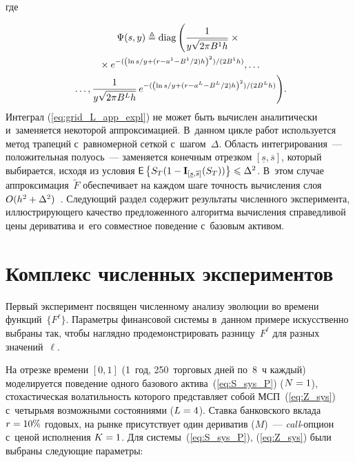 \begin{multicols}{2}
\noindent
где

\columnbreak


\noindent
\begin{multline*}
\Psi(s,y) \triangleq
\mathrm{diag} 
\left(\displaystyle\frac{\displaystyle 1\mathstrut}{\displaystyle y\sqrt{2\pi B^1 h}\mathstrut}\times{}\right.\\
{}\times e^{- ({\left( \ln {s}/{y}  +
(r- a^1 - {B^1}/{2} )h\right)^2})/({2B^1h})},\ldots \\
\left.\ldots,
\displaystyle\frac{\displaystyle 1\mathstrut}{\displaystyle y\sqrt{2\pi B^L h}\mathstrut}\, e^{- ({\left( \ln {s}/{y}  +
(r- a^L - {B^L}/{2} )h\right)^2})/(2B^Lh) }
\right)\!.\hspace*{-1.81146pt}
\end{multline*}
Интеграл (\ref{eq:grid_L_app_expl}) не может быть вы\-чис\-лен аналитически и~заменяется некоторой аппроксимацией.
В~данном цик\-ле работ используется метод трапеций с~рав\-но\-мер\-ной сеткой с~шагом~$\Delta$. 
Об\-ласть интегрирования~--- положительная полуось~--- заменяется конечным отрезком $[\underline{s},\overline{s}]$, который выбирается, исходя из условия
$
{\sf E}\left\{S_T (1 - \mathbf{I}_{[\underline{s},\overline{s}]}(S_T))\right\} \hm\leqslant \Delta^2$. 
В~этом случае аппроксимация~$\widetilde{F}$ обеспечивает на каж\-дом шаге точ\-ность вы\-чис\-ле\-ния слоя $O(h^2\hm+ \Delta^2)$~\cite{Ya_67}. 
Сле\-ду\-ющий раздел содержит результаты чис\-лен\-но\-го эксперимента, ил\-люст\-ри\-ру\-юще\-го качество предложенного алгоритма 
вы\-чис\-ле\-ния справедливой цены дериватива и~его совместное поведение с~базовым ак\-тивом.

\vspace*{-2pt}

\section{Комплекс численных экспериментов}

\vspace*{-2pt}


Первый эксперимент посвящен чис\-лен\-но\-му анализу эволюции  во времени функций~$\{F^{\ell}\}$.
Па\-ра\-мет\-ры финансовой сис\-те\-мы в~данном примере искусственно выбраны так, 
чтобы на\-гляд\-но продемонстрировать разницу~$F^{\ell}$ для разных значений~$\ell$.

На отрезке времени $[0,1]$ (1~год, 250~торговых дней по~8~ч каж\-дый) моделируется поведение одного базового актива~(\ref{eq:S_sys_P})
($N\hm=1$), сто\-ха\-сти\-че\-ская во\-ла\-тиль\-ность которого пред\-став\-ля\-ет собой МСП~(\ref{eq:Z_sys}) 
с~че\-тырь\-мя воз\-мож\-ны\-ми со\-сто\-яни\-ями ($L \hm= 4$).
Став\-ка банковского вклада $r \hm= 10\%$ годовых, на рын\-ке присутствует один дериватив ($M$)~--- 
\textit{call}-оп\-ци\-он с~ценой исполнения $K\hm=1$. Для сис\-те\-мы~(\ref{eq:S_sys_P}), (\ref{eq:Z_sys}) 
были выбраны сле\-ду\-ющие па\-ра\-метры:


\end{multicols}
